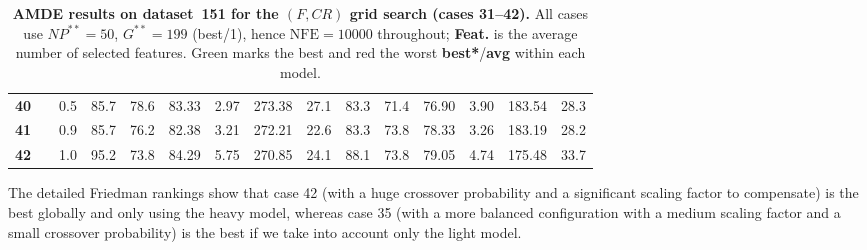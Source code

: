 \documentclass[12pt, openany]{article}
\begin{document}
\begin{table}[H]
{\begin{tabular}{|c c c | c c c c c c | c c c c c c |}
        \textbf{40} &  & 0.5 & \cellcolor{worst}85.7 & 78.6 & 83.33 & 2.97 & 273.38 & 27.1 & \cellcolor{worst}83.3 & 71.4 & \cellcolor{worst}76.90 & 3.90 & 183.54 & 28.3 \\
        \textbf{41} &  & 0.9 & \cellcolor{worst}85.7 & 76.2 & 82.38 & 3.21 & 272.21 & 22.6 & \cellcolor{worst}83.3 & 73.8 & 78.33 & 3.26 & 183.19 & 28.2 \\
        \textbf{42} &  & 1.0 & \cellcolor{best}95.2 & 73.8 & \cellcolor{best}84.29 & 5.75 & 270.85 & 24.1 & 88.1 & 73.8 & 79.05 & 4.74 & 175.48 & 33.7 \\
        \hline
    \end{tabular}
    }
    \caption{\textbf{AMDE results on dataset~151 for the $(F, CR)$ grid search (cases 31--42).} All cases use $NP^{**}{=}50$, $G^{**}{=}199$ (best/1), hence $\mathrm{NFE}=10000$ throughout; \textbf{Feat.} is the average number of selected features. Green marks the best and red the worst \textbf{best*}/\textbf{avg} within each model.}
    \label{tab:results_AMDE_FCR_d151}
\end{table}

The detailed Friedman rankings show that case 42 (with a huge crossover probability and a significant scaling factor to compensate) is the best globally and only using the heavy model, whereas case 35 (with a more balanced configuration with a medium scaling factor and a small crossover probability) is the best if we take into account only the light model.
\end{document}
